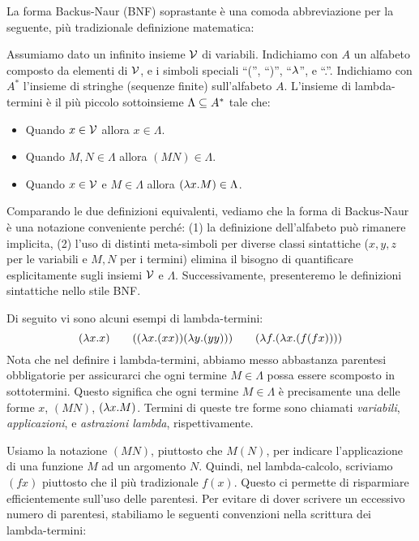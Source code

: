 \documentclass{article}
\begin{document}
La forma Backus-Naur (BNF) soprastante \`e una comoda abbreviazione per
la seguente, pi\`u tradizionale definizione matematica:

\begin{definition}
  Assumiamo dato un infinito insieme ${\cal V}$ di variabili. Indichiamo con $A$ un
  alfabeto composto da elementi di ${\cal V}$, e i simboli
  speciali ``('', ``)'', ``$\lambda$'', e ``.''. Indichiamo con $A^*$ l'insieme di
  stringhe (sequenze finite) sull'alfabeto $A$. L'insieme di
  lambda-termini \`e il pi\`u piccolo sottoinsieme $\Lambda\subseteq A^*$ tale che:
  \begin{itemize}
  \item Quando $x\in{\cal V}$ allora $x\in\Lambda$.
  \item Quando $M,N\in\Lambda$ allora $(MN)\in\Lambda$.
  \item Quando $x\in{\cal V}$ e $M\in\Lambda$ allora $(\lambda x.M)\in\Lambda$.
  \end{itemize}
\end{definition}

Comparando le due definizioni equivalenti, vediamo che la
forma di Backus-Naur \`e una notazione conveniente perch\'e: (1) la definizione
dell'alfabeto pu\`o rimanere implicita, (2) l'uso di distinti meta-simboli
per diverse classi sintattiche ($x,y,z$ per le variabili e $M,N$ per
i termini) elimina il bisogno di quantificare esplicitamente sugli insiemi 
${\cal V}$ e $\Lambda$. Successivamente, presenteremo le 
definizioni sintattiche nello stile BNF.

Di seguito vi sono alcuni esempi di lambda-termini:
\[ (\lambda x.x) \hspace{2em} ((\lambda x.(xx))(\lambda y.(yy))) \hspace{2em} (\lambda f.(\lambda x.(f(fx))))
\]
Nota che nel definire i lambda-termini, abbiamo messo abbastanza
parentesi obbligatorie per assicurarci che ogni termine $M\in\Lambda$ possa essere
scomposto in sottotermini. Questo significa che ogni termine $M\in\Lambda$
\`e precisamente una delle forme $x$, $(MN)$, $(\lambda x.M)$. Termini di
queste tre forme sono chiamati {\em variabili}, {\em applicazioni}, e 
{\em astrazioni lambda}, rispettivamente.

Usiamo la notazione $(MN)$, piuttosto che $M(N)$, per indicare
l'applicazione di una funzione $M$ ad un argomento $N$. Quindi, nel
lambda-calcolo, scriviamo $(fx)$ piuttosto che il pi\`u tradizionale $f(x)$. Questo
ci permette di risparmiare efficientemente sull'uso delle parentesi.
Per evitare di dover scrivere un eccessivo numero di parentesi, stabiliamo
le seguenti convenzioni nella scrittura dei lambda-termini:
\end{document}
